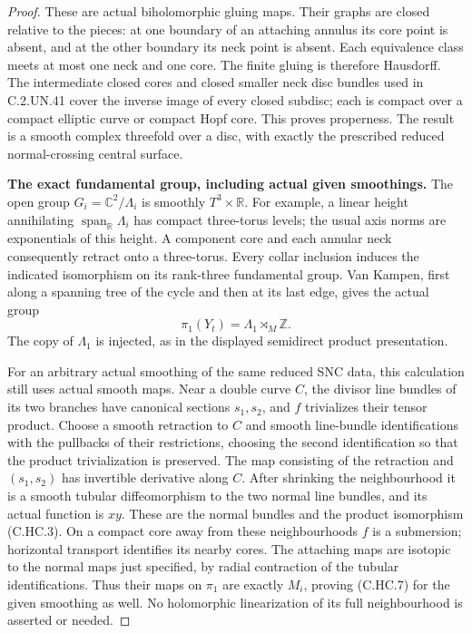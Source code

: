 \begin{proof}
These are actual biholomorphic gluing maps.
Their graphs are closed relative to the pieces:
at one boundary of an attaching annulus its core
point is absent, and at the other boundary its
neck point is absent. Each equivalence class
meets at most one neck and one core. The finite
gluing is therefore Hausdorff. The intermediate
closed cores and closed smaller neck disc bundles
used in C.2.UN.41 cover the inverse image of every
closed subdisc; each is compact over a compact
elliptic curve or compact Hopf core. This proves
properness. The result is a smooth complex
threefold over a disc, with exactly the prescribed
reduced normal-crossing central surface.

\par\medskip\noindent\textbf{The exact fundamental group, including actual given smoothings.}
The open group $G_i=\mathbb C^2/\Lambda_i$ is
smoothly $T^3\times\mathbb R$.
For example, a linear height annihilating
$\operatorname{span}_{\mathbb R}\Lambda_i$ has
compact three-torus levels; the usual axis norms
are exponentials of this height. A component
core and each annular neck consequently retract
onto a three-torus. Every collar inclusion
induces the indicated isomorphism on its
rank-three fundamental group. Van Kampen,
first along a spanning tree of the cycle and
then at its last edge, gives the actual group
\[
                       \pi_1(Y_t)=\Lambda_1\rtimes_M\mathbb Z.
\tag{C.HC.7}
\]
The copy of $\Lambda_1$ is injected, as in the
displayed semidirect product presentation.

For an arbitrary actual smoothing of the same
reduced SNC data, this calculation still uses
actual smooth maps. Near a double curve $C$,
the divisor line bundles of its two branches
have canonical sections $s_1,s_2$, and $f$
trivializes their tensor product. Choose a
smooth retraction to $C$ and smooth line-bundle
identifications with the pullbacks of their
restrictions, choosing the second identification
so that the product trivialization is preserved.
The map consisting of the retraction and
$(s_1,s_2)$ has invertible derivative along $C$.
After shrinking the neighbourhood it is a
smooth tubular diffeomorphism to the two
normal line bundles, and its actual function
is $xy$. These are the normal bundles and
the product isomorphism (C.HC.3).
On a compact core away from these neighbourhoods
$f$ is a submersion; horizontal transport
identifies its nearby cores. The attaching
maps are isotopic to the normal maps just
specified, by radial contraction of the
tubular identifications. Thus their maps on
$\pi_1$ are exactly $M_i$, proving (C.HC.7)
for the given smoothing as well. No holomorphic
linearization of its full neighbourhood is
asserted or needed.


\end{proof}
